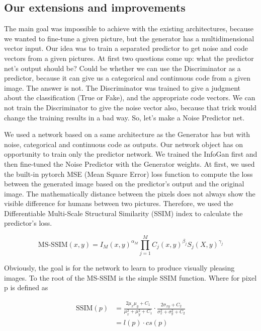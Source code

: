 \documentclass{egpubl}
\begin{document}
\subsection{Our extensions and improvements}
The main goal was impossible to achieve with the existing architectures, because we wanted to fine-tune a given picture, but the generator has a multidimensional vector input. Our idea was to train a separated predictor to get noise and code vectors from a given pictures.  At first two questions come up: what the predictor net’s output should be? Could be whether we can use the Discriminator as a predictor, because it can give us a categorical and continuous code from a given image. The answer is not. The Discriminator was trained to give a judgment about the classification (True or Fake), and the appropriate code vectors. We can not train the Discriminator to give the noise vector also, because that trick would change the training results in a bad way. So, let’s make a Noise Predictor net.

We used a network based on a same architecture as the Generator has but with noise, categorical and continuous code as outputs. Our network object has on opportunity to train only the predictor network. We trained the InfoGan first and then fine-tuned the Noise Predictor with the Generator weights. At first, we used the built-in pytorch MSE (Mean Square Error) loss function to compute the loss between the generated image based on the predictor’s output and the original image. The mathematically distance between the pixels does not always show the visible difference for humans between two pictures. Therefore, we used the Differentiable Multi-Scale Structural Similarity (SSIM) index to calculate the predictor’s loss.



\begin{displaymath}
\mathrm{MS\mbox{-}SSIM}(x,y) = I_M(x,y)^{\alpha_M} \prod_{j=1}^{M} C_j(x,y)^{\beta_j}S_j(X,y)^{\gamma_j}
\end{displaymath}

Obviously, the goal is for the network to learn to produce visually pleasing images. To the root of the MS-SSIM is the simple SSIM function. Where for pixel p is defined as 

\begin{equation}
\begin{aligned}
\mathrm{SSIM}(p) &= \frac{2\mu_x\mu_y + C_1}{\mu_x^2 + \mu_y^2 + C_1}\cdot\frac{2\sigma_{xy} + C_2}{\sigma_x^2 + \sigma_y^2 + C_2} \\ 
&= l(p)\cdot cs(p)
\end{aligned}
\end{equation}
\end{document}
